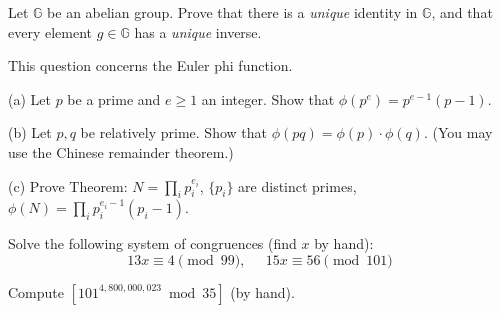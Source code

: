 \documentclass[12pt,letterpaper,boxed]{amspset}
\begin{document}

\begin{problem}[7.1]
Let $\mathbb{G}$ be an abelian group. Prove that there is a \emph{unique} identity in $\mathbb{G}$, and that every element $g \in \mathbb{G}$ has a \emph{unique} inverse.
\end{problem}
\begin{solution}
\vspace{3cm}
\end{solution}

\begin{problem}[7.2]
This question concerns the Euler phi function.
\end{problem}

\begin{solution}
(a) Let  $p$ be a prime and $e \ge 1$ an integer. Show that $\phi(p^e) = p^{e-1}(p-1)$.
\vspace{3cm}

\noindent (b) Let $p,q$ be relatively prime. Show that $\phi(pq) = \phi(p)\cdot \phi(q)$. (You may use the Chinese remainder theorem.)
\vspace{4cm}

\noindent (c) Prove Theorem: $N = \prod_ip_i^{e_i}$, $\{p_i\}$ are distinct primes, $\phi(N) = \prod_ip_i^{e_i-1}(p_i-1)$.
\vspace{3cm}

\end{solution}

\begin{problem}[7.3]
Solve the following system of congruences (find $x$ by hand):
\[ 13x \equiv 4 \pmod{99},\;\;\;\;\; 15x \equiv 56 \pmod{101}\]
\end{problem}

\begin{solution}
\vspace{3cm}

\end{solution}



\begin{problem}[7.4]
Compute $[101^{4,800,000,023} \bmod 35]$ (by hand).
\end{problem}

\begin{solution}
\vspace{4cm}

\end{solution}
\end{document}
